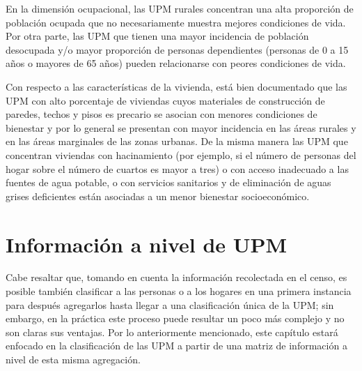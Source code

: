 \documentclass[
  12pt,
]{book}
\begin{document}
En la dimensión ocupacional, las UPM rurales concentran una alta proporción de población ocupada que no necesariamente muestra mejores condiciones de vida. Por otra parte, las UPM que tienen una mayor incidencia de población desocupada y/o mayor proporción de personas dependientes (personas de 0 a 15 años o mayores de 65 años) pueden relacionarse con peores condiciones de vida.

Con respecto a las características de la vivienda, está bien documentado que las UPM con alto porcentaje de viviendas cuyos materiales de construcción de paredes, techos y pisos es precario se asocian con menores condiciones de bienestar y por lo general se presentan con mayor incidencia en las áreas rurales y en las áreas marginales de las zonas urbanas. De la misma manera las UPM que concentran viviendas con hacinamiento (por ejemplo, si el número de personas del hogar sobre el número de cuartos es mayor a tres) o con acceso inadecuado a las fuentes de agua potable, o con servicios sanitarios y de eliminación de aguas grises deficientes están asociadas a un menor bienestar socioeconómico.

\hypertarget{informaciuxf3n-a-nivel-de-upm}{%
\section{Información a nivel de UPM}\label{informaciuxf3n-a-nivel-de-upm}}

Cabe resaltar que, tomando en cuenta la información recolectada en el censo, es posible también clasificar a las personas o a los hogares en una primera instancia para después agregarlos hasta llegar a una clasificación única de la UPM; sin embargo, en la práctica este proceso puede resultar un poco más complejo y no son claras sus ventajas. Por lo anteriormente mencionado, este capítulo estará enfocado en la clasificación de las UPM a partir de una matriz de información a nivel de esta misma agregación.
\end{document}
